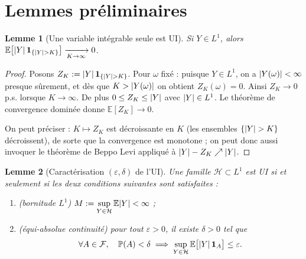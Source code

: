 \documentclass[11pt,a4paper]{article}
\newtheorem{lemma}{Lemme}
\theoremstyle{definition}
\theoremstyle{remark}
\newcommand{\E}{\mathbb{E}}
\newcommand{\PP}{\mathbb{P}}
\newcommand{\F}{\mathcal{F}}
\newcommand{\Hf}{\mathcal{H}}
\newcommand{\ind}[1]{\mathbf{1}_{#1}}
\DeclarePairedDelimiter{\abs}{\lvert}{\rvert}
\begin{document}
\section{Lemmes préliminaires}

\begin{lemma}[Une variable intégrable seule est UI]\label{lem:A}
Si $Y \in L^1$, alors
$\E\big[\abs{Y}\,\ind{\{\abs{Y} > K\}}\big] \xrightarrow[K \to \infty]{} 0$.
\end{lemma}

\begin{proof}
Posons $Z_K := \abs{Y}\,\ind{\{\abs{Y} > K\}}$. Pour $\omega$ fixé : puisque
$Y \in L^1$, on a $\abs{Y(\omega)} < \infty$ presque sûrement, et dès que
$K > \abs{Y(\omega)}$ on obtient $Z_K(\omega) = 0$. Ainsi $Z_K \to 0$ p.s.
lorsque $K \to \infty$. De plus $0 \le Z_K \le \abs{Y}$ avec $\abs{Y} \in L^1$.
Le théorème de convergence dominée donne $\E[Z_K] \to 0$.

On peut préciser : $K \mapsto Z_K$ est décroissante en $K$ (les ensembles
$\{\abs{Y} > K\}$ décroissent), de sorte que la convergence est monotone ; on
peut donc aussi invoquer le théorème de Beppo Levi appliqué à
$\abs{Y} - Z_K \nearrow \abs{Y}$.
\end{proof}

\begin{lemma}[Caractérisation $(\varepsilon,\delta)$ de l'UI]\label{lem:B}
Une famille $\Hf \subset L^1$ est UI si et seulement si les deux conditions
suivantes sont satisfaites :
\begin{enumerate}[label=(\alph*)]
\item \emph{(bornitude $L^1$)} \quad
$M := \displaystyle\sup_{Y \in \Hf} \E\abs{Y} < \infty$ ;
\item \emph{(équi-absolue continuité)} \quad pour tout $\varepsilon > 0$, il
existe $\delta > 0$ tel que
\[
\forall A \in \F, \quad \PP(A) < \delta
\;\Longrightarrow\;
\sup_{Y \in \Hf} \E\big[\abs{Y}\,\ind{A}\big] \le \varepsilon.
\]
\end{enumerate}
\end{lemma}
\end{document}
